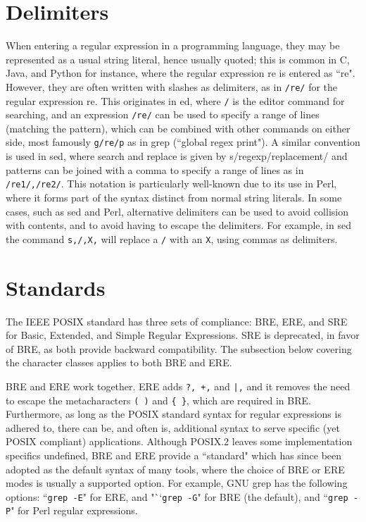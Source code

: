 \section{Delimiters}


When entering a regular expression in a programming language, they may be represented as a usual string literal, hence usually quoted; this is common in C, Java, and Python for instance, where the regular expression re is entered as ``re". However, they are often written with slashes as delimiters, as in \texttt{/re/} for the regular expression re. This originates in ed, where \texttt{/} is the editor command for searching, and an expression \texttt{/re/} can be used to specify a range of lines (matching the pattern), which can be combined with other commands on either side, most famously \texttt{g/re/p} as in grep (``global regex print"). A similar convention is used in sed, where search and replace is given by s/regexp/replacement/ and patterns can be joined with a comma to specify a range of lines as in \texttt{/re1/,/re2/}. This notation is particularly well-known due to its use in Perl, where it forms part of the syntax distinct from normal string literals. In some cases, such as sed and Perl, alternative delimiters can be used to avoid collision with contents, and to avoid having to escape the delimiters. For example, in sed the command \texttt{s,/,X,} will replace a \texttt{/} with an \texttt{X}, using commas as delimiters.


\section{Standards}

The IEEE POSIX standard has three sets of compliance: BRE, ERE, and SRE for Basic, Extended, and Simple Regular Expressions. SRE is deprecated, in favor of BRE, as both provide backward compatibility. The subsection below covering the character classes applies to both BRE and ERE.

BRE and ERE work together. ERE adds \texttt{?, +,} and \texttt{|,} and it removes the need to escape the metacharacters \texttt{( )} and \texttt{\{ \}}, which are required in BRE. Furthermore, as long as the POSIX standard syntax for regular expressions is adhered to, there can be, and often is, additional syntax to serve specific (yet POSIX compliant) applications. Although POSIX.2 leaves some implementation specifics undefined, BRE and ERE provide a ``standard" which has since been adopted as the default syntax of many tools, where the choice of BRE or ERE modes is usually a supported option. For example, GNU grep has the following options: ``\texttt{grep -E}" for ERE, and "``\texttt{grep -G}" for BRE (the default), and ``\texttt{grep -P}" for Perl regular expressions.

